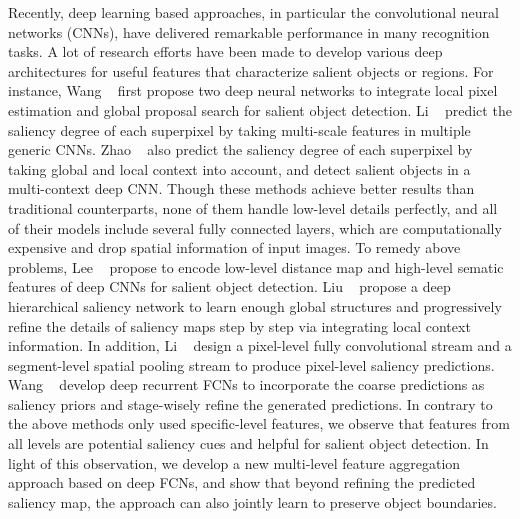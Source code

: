 \documentclass[10pt,twocolumn,letterpaper]{article}
\begin{document}
Recently, deep learning based approaches, in particular the convolutional neural networks (CNNs), have delivered
remarkable performance in many recognition tasks.
A lot of research efforts have been made to develop various deep architectures for useful features that characterize salient objects or regions.
%
For instance, Wang \etal~\cite{wang2015deep} first propose two deep neural networks to integrate local pixel estimation and global proposal search for salient object detection.
Li \etal~\cite{li2015visual} predict the saliency degree of each superpixel by taking multi-scale features in multiple generic CNNs.
%
Zhao \etal~\cite{zhao2015saliency} also predict the saliency degree of each superpixel by taking global and local context into account, and detect salient objects in a multi-context deep CNN.
%
Though these methods achieve better results than traditional counterparts, none of them handle low-level details perfectly, and all of their models include several fully connected layers, which are computationally expensive and drop spatial information of input images.
%
To remedy above problems, Lee \etal~\cite{lee2016deep} propose to encode low-level distance map and high-level sematic features of deep CNNs for salient object detection.
%
Liu \etal~\cite{liu2016dhsnet} propose a deep hierarchical saliency network to learn enough global structures and progressively refine the details of saliency maps step by step via integrating local context
information.
In addition, Li \etal~\cite{LiYu16} design a pixel-level fully convolutional stream
and a segment-level spatial pooling stream to produce pixel-level saliency predictions.
%
Wang \etal~\cite{wang2016saliency} develop deep recurrent FCNs to incorporate the coarse predictions as saliency priors and stage-wisely refine the generated predictions.
%
In contrary to the above methods only used specific-level features, we observe that features from all levels are potential saliency cues and helpful for salient object detection.
%
In light of this observation, we develop a new multi-level feature aggregation approach based on deep FCNs, and show that beyond refining the predicted saliency map, the approach can also jointly learn to preserve object boundaries.
\end{document}
